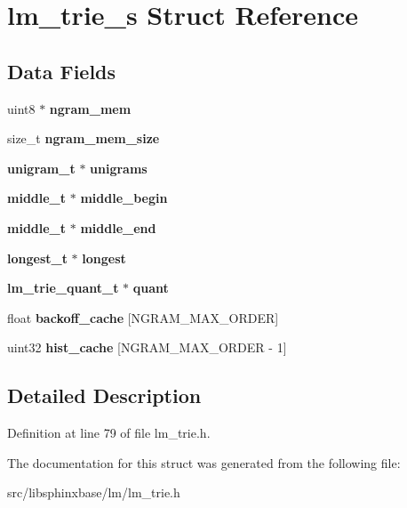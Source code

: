 \section{lm\+\_\+trie\+\_\+s Struct Reference}
\label{structlm__trie__s}
\subsection*{Data Fields}
\begin{DoxyCompactItemize}
\item 
\mbox{\label{structlm__trie__s_a58167a5c232538cebd3e083a097a9a1b}} 
uint8 $\ast$ {\bfseries ngram\+\_\+mem}
\item 
\mbox{\label{structlm__trie__s_af256466f3eff8c3b665f10200815ba1d}} 
size\+\_\+t {\bfseries ngram\+\_\+mem\+\_\+size}
\item 
\mbox{\label{structlm__trie__s_a22667bd186be6bf3804a3a597c96bd93}} 
\textbf{ unigram\+\_\+t} $\ast$ {\bfseries unigrams}
\item 
\mbox{\label{structlm__trie__s_aa4a224213e7c1f5fcdb8b15169c237de}} 
\textbf{ middle\+\_\+t} $\ast$ {\bfseries middle\+\_\+begin}
\item 
\mbox{\label{structlm__trie__s_a7f39ce792b398ba89e5db14a895189e9}} 
\textbf{ middle\+\_\+t} $\ast$ {\bfseries middle\+\_\+end}
\item 
\mbox{\label{structlm__trie__s_ade570f476da0d4fb1d865a7eb4285a3b}} 
\textbf{ longest\+\_\+t} $\ast$ {\bfseries longest}
\item 
\mbox{\label{structlm__trie__s_a0a25fcb4269d21eba7596524b4f39bbd}} 
\textbf{ lm\+\_\+trie\+\_\+quant\+\_\+t} $\ast$ {\bfseries quant}
\item 
\mbox{\label{structlm__trie__s_a8e77be0a2f9072567efdaccdcae578e3}} 
float {\bfseries backoff\+\_\+cache} [N\+G\+R\+A\+M\+\_\+\+M\+A\+X\+\_\+\+O\+R\+D\+ER]
\item 
\mbox{\label{structlm__trie__s_a1ab9c1e664ca9702ee5423e6dbbd7c1f}} 
uint32 {\bfseries hist\+\_\+cache} [N\+G\+R\+A\+M\+\_\+\+M\+A\+X\+\_\+\+O\+R\+D\+ER -\/ 1]
\end{DoxyCompactItemize}


\subsection{Detailed Description}


Definition at line 79 of file lm\+\_\+trie.\+h.



The documentation for this struct was generated from the following file\+:\begin{DoxyCompactItemize}
\item 
src/libsphinxbase/lm/lm\+\_\+trie.\+h\end{DoxyCompactItemize}
